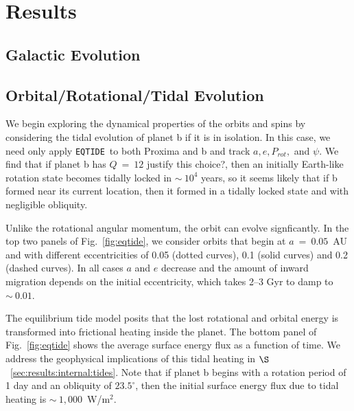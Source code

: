 \documentclass[preprint,12pt]{aastex}
\newcommand{\xxx}[1]{{\color{red} #1}} %
\def\eqtide{\texttt{\footnotesize{EQTIDE}}\xspace}
\begin{document}
\section{Results\label{sec:results}}

\subsection{Galactic Evolution}
\label{sec:results:galactic}


\subsection{Orbital/Rotational/Tidal Evolution}
\label{sec:results:orbital}

We begin exploring the dynamical properties of the orbits and spins by
considering the tidal evolution of planet b if it is in isolation. In
this case, we need only apply \eqtide~to both Proxima and b and track
$a, e, P_{rot},$ and $\psi$. We find that if planet b has $Q~=~12$ \xxx{justify this choice?},
then an initially Earth-like rotation state becomes tidally locked in
$\sim~10^4$ years, so it seems likely that if b formed near its
current location, then it formed in a tidally locked state and with
negligible obliquity.

Unlike the rotational angular momentum, the orbit can evolve
signficantly. In the top two panels of Fig.~\ref{fig:eqtide}, we
consider orbits that begin at $a~=~0.05$~AU and with different
eccentricities of 0.05 (dotted curves), 0.1 (solid curves) and 0.2
(dashed curves). In all cases $a$ and $e$ decrease and the amount of
inward migration depends on the initial eccentricity, which takes 2--3
Gyr to damp to $\sim~0.01$.

The equilibrium tide model posits that the lost rotational and orbital
energy is transformed into frictional heating inside the planet. The
bottom panel of Fig.~\ref{fig:eqtide} shows the average surface energy
flux as a function of time. We address the geophysical implications of
this tidal heating in $\S$~\ref{sec:results:internal:tides}. Note that if planet
b begins with a rotation period of 1 day and an obliquity of
$23.5^\circ$, then the initial surface energy flux due to tidal
heating is $\sim~1,000$~W/m$^{2}$.
\end{document}
